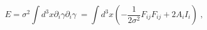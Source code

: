 \begin{equation}
E=\sigma ^{2}\int d^{3}x\partial _{i}\gamma \partial _{i}\gamma \;=\int
d^{3}x\left( -\frac{1}{2\sigma ^{2}}F_{ij}F_{ij}+2A_{i}I_{i}\right) \;,
\label{bs}
\end{equation}

